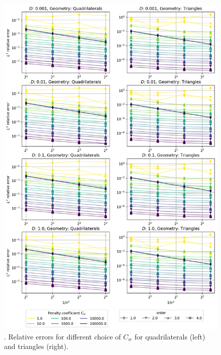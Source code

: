\begin{figure}[p!]
	\centering
	\includegraphics[height=\textheight]{../figs/parametric/diffusion_2D/laplace.png}
	\caption{. Relative errors for different choice of $C_w$  for
		quadrilaterals (left) and triangles (right).}
	\label{fig:conv_laplace}
\end{figure}